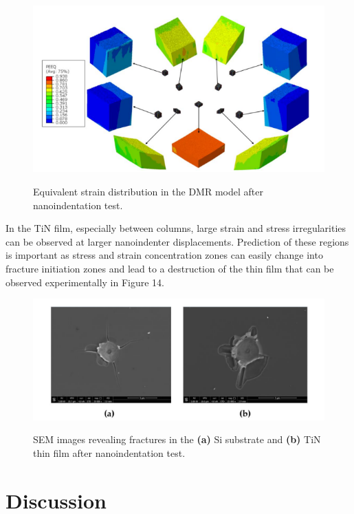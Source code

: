\documentclass[journal,article,submit,pdftex,moreauthors]{Definitions/mdpi}
\begin{document}
\begin{figure}[H]
  \captionsetup{justification=centering}
  \centering
  \includegraphics{Definitions/picture13.png}
  \label{fig:obraz13}
    \caption{Equivalent strain distribution in the DMR model after nanoindentation test.}
\end{figure}  
 
In the TiN film, especially between columns, large strain and stress irregularities can be observed at larger nanoindenter displacements. Prediction of these regions is important as stress and strain concentration zones can easily change into fracture initiation zones and lead to a destruction of the thin film that can be observed experimentally in Figure 14.
 
\begin{figure}[H]
  \captionsetup{justification=centering}
  \centering
  \includegraphics{Definitions/picture14.png}
  \label{fig:obraz14}
    \caption{SEM images revealing fractures in the \textbf{(a)} Si substrate and \textbf{(b)} TiN thin film after nanoindentation test.}
\end{figure}  
 
\section{Discussion}
 
\end{document}

